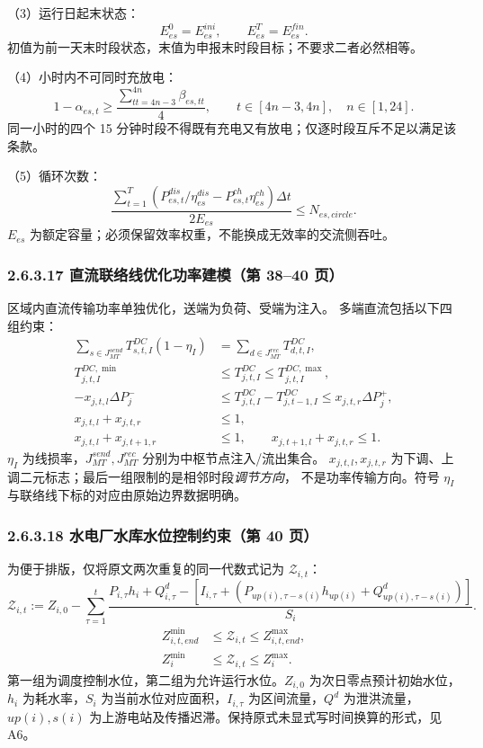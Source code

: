 （3）运行日起末状态：
\begin{equation}
 E^0_{es}=E^{ini}_{es},\qquad E^T_{es}=E^{fin}_{es}.
\end{equation}
初值为前一天末时段状态，末值为申报末时段目标；不要求二者必然相等。

（4）小时内不可同时充放电：
\begin{equation}
 1-\alpha_{es,t}\ge\frac{\sum_{tt=4n-3}^{4n}\beta_{es,tt}}{4},
 \qquad t\in[4n-3,4n],\quad n\in[1,24].
\end{equation}
同一小时的四个 15 分钟时段不得既有充电又有放电；仅逐时段互斥不足以满足该条款。

（5）循环次数：
\begin{equation}
 \frac{\sum_{t=1}^{T}(P^{dis}_{es,t}/\eta^{dis}_{es}
                  -P^{ch}_{es,t}\eta^{ch}_{es})\Delta t}{2E_{es}}
 \le N_{es,circle}.
\end{equation}
$E_{es}$ 为额定容量；必须保留效率权重，不能换成无效率的交流侧吞吐。

\subsubsection{2.6.3.17 直流联络线优化功率建模（第 38--40 页）}
区域内直流传输功率单独优化，送端为负荷、受端为注入。
多端直流包括以下四组约束：
\begin{align}
 \sum_{s\in J^{send}_{MT}}T^{DC}_{s,t,I}(1-\eta_I)
       &=\sum_{d\in J^{rec}_{MT}}T^{DC}_{d,t,I},\\
 T^{DC,\min}_{j,t,I}&\le T^{DC}_{j,t,I}\le T^{DC,\max}_{j,t,I},\\
 -x_{j,t,l}\Delta P_j^-&\le T^{DC}_{j,t,I}-T^{DC}_{j,t-1,I}
                      \le x_{j,t,r}\Delta P_j^+,\\
 x_{j,t,l}+x_{j,t,r}&\le1,\\
 x_{j,t,l}+x_{j,t+1,r}&\le1,\qquad
 x_{j,t+1,l}+x_{j,t,r}\le1.
\end{align}
$\eta_I$ 为线损率，$J^{send}_{MT},J^{rec}_{MT}$ 分别为中枢节点注入/流出集合。
$x_{j,t,l},x_{j,t,r}$ 为下调、上调二元标志；最后一组限制的是相邻时段\emph{调节方向}，
不是功率传输方向。符号 $\eta_I$ 与联络线下标的对应由原始边界数据明确。

\subsubsection{2.6.3.18 水电厂水库水位控制约束（第 40 页）}
为便于排版，仅将原文两次重复的同一代数式记为 $\mathcal Z_{i,t}$：
\begin{equation}
 \mathcal Z_{i,t}:=Z_{i,0}-\sum_{\tau=1}^{t}
 \frac{P_{i,\tau}h_i+Q^d_{i,\tau}
 -[I_{i,\tau}+(P_{up(i),\tau-s(i)}h_{up(i)}+Q^d_{up(i),\tau-s(i)})]}{S_i}.
\end{equation}
\begin{align}
 Z^{\min}_{i,t,end}&\le\mathcal Z_{i,t}\le Z^{\max}_{i,t,end},\\
 Z_i^{\min}&\le\mathcal Z_{i,t}\le Z_i^{\max}.
\end{align}
第一组为调度控制水位，第二组为允许运行水位。$Z_{i,0}$ 为次日零点预计初始水位，
$h_i$ 为耗水率，$S_i$ 为当前水位对应面积，$I_{i,\tau}$ 为区间流量，$Q^d$ 为泄洪流量，
$up(i),s(i)$ 为上游电站及传播迟滞。保持原式未显式写时间换算的形式，见 A6。

